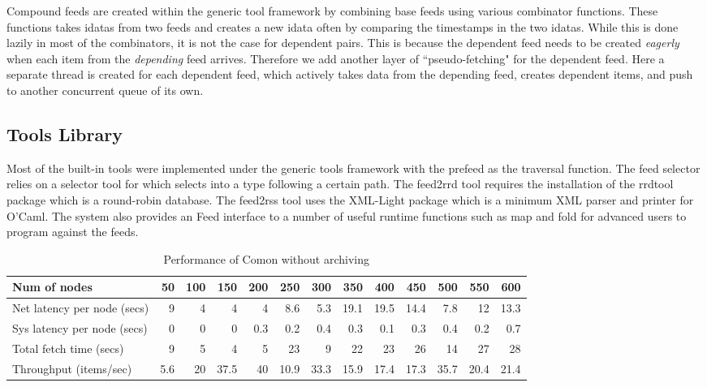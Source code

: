 Compound feeds are created within the generic tool framework by
combining base feeds using various combinator functions.
These functions takes idatas from two feeds and creates a new idata often
by comparing the timestamps in the two idatas. While this is done
lazily in most of the combinators, it is not the case for
dependent pairs. This is because the dependent feed needs to be
created {\em eagerly} when each item from the {\em depending}
feed arrives. Therefore we add another layer of ``pseudo-fetching"
for the dependent feed. Here a separate thread is created for each
dependent feed, which actively takes data from the depending
feed, creates dependent items, and push to another concurrent
queue of its own.  
 
\subsection{Tools Library}
Most of the built-in tools were implemented under the
generic tools framework with the prefeed as the traversal
function. The feed selector relies on a selector tool
for \padsml{} which selects into a \padsml{} type following
a certain path. The feed2rrd tool requires the installation
of the rrdtool package which is a round-robin database. 
The feed2rss tool uses the XML-Light package which
is a minimum XML parser and printer for O'Caml.
The system also provides an Feed interface to a number of
useful runtime functions such as map and fold for advanced
users to program against the feeds.

\begin{table*}[th]
\begin{center}
\begin{tabular}{|l|r|r|r|r|r|r|r|r|r|r|r|r|}\hline
Num of nodes&	50&	100&	150&	200&	250&	300&	350&	400&	450&	500&	550&	600 \\ \hline\hline
Net latency per node (secs)&	9&	4&	4&	4&	8.6&	5.3&	19.1&	19.5&	14.4&	7.8&	12&	13.3 \\ \hline
Sys latency per node (secs)&	0&	0&	0&	0.3&	0.2&	0.4&	0.3&	0.1&	0.3&	0.4&	0.2&	0.7 \\ \hline
Total fetch time (secs)&	9&	5&	4&	5&	23&	9&	22&	23&	26&	14&	27&	28 \\ \hline	
Throughput (items/sec)&	5.6&	20&	37.5&	40&	10.9&	33.3&	15.9&	17.4&	17.3&	35.7&	20.4&	21.4 \\ \hline
\end{tabular}
\end{center}
\caption{Performance of Comon without archiving}
\label{tab:comon-noarch}
\end{table*}


